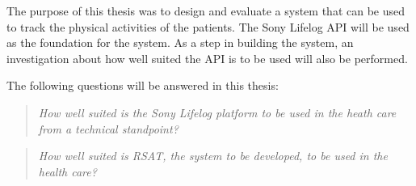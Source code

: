 \documentclass{cslthse-msc}
\begin{document}
The purpose of this thesis was to design and evaluate a system that can be used to track the physical activities of the patients. The Sony Lifelog API will be used as the foundation for the system. As a step in building the system, an investigation about how well suited the API is to be used will also be performed. 

The following questions will be %
answered in this thesis:

\begin{quote}
\centering
\emph{How well suited is the Sony Lifelog platform to be used in the heath care from a technical standpoint?}
\end{quote}

\begin{quote}
\centering
\emph{How well suited is RSAT, the system to be developed, to be used in the health care?}
\end{quote}

\end{document}
